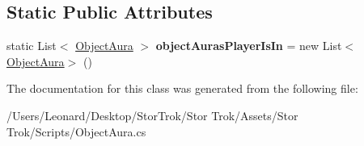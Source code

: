 \subsection*{Static Public Attributes}
\begin{DoxyCompactItemize}
\item 
\mbox{\label{class_object_aura_a252f79dcddf2bc70c559f0ca499accb3}} 
static List$<$ \hyperlink{class_object_aura}{Object\+Aura} $>$ {\bfseries object\+Auras\+Player\+Is\+In} = new List$<$\hyperlink{class_object_aura}{Object\+Aura}$>$ ()
\end{DoxyCompactItemize}


The documentation for this class was generated from the following file\+:\begin{DoxyCompactItemize}
\item 
/\+Users/\+Leonard/\+Desktop/\+Stor\+Trok/\+Stor Trok/\+Assets/\+Stor Trok/\+Scripts/Object\+Aura.\+cs\end{DoxyCompactItemize}
